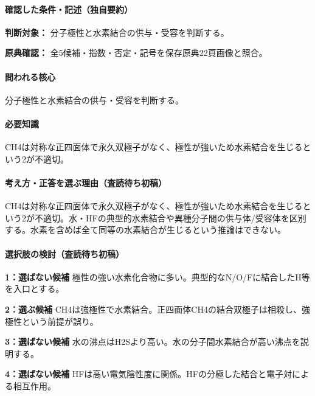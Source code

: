 \paragraph{確認した条件・記述（独自要約）}\mbox{}\par

\noindent\textbf{判断対象：} 分子極性と水素結合の供与・受容を判断する。\par

\noindent\textbf{原典確認：} 全5候補・指数・否定・記号を保存原典22頁画像と照合。\par

\paragraph{問われる核心} 分子極性と水素結合の供与・受容を判断する。

\paragraph{必要知識} CH4は対称な正四面体で永久双極子がなく、極性が強いため水素結合を生じるという2が不適切。

\paragraph{考え方・正答を選ぶ理由（査読待ち初稿）} CH4は対称な正四面体で永久双極子がなく、極性が強いため水素結合を生じるという2が不適切。水・HFの典型的水素結合や異種分子間の供与体/受容体を区別する。水素を含めば全て同等の水素結合が生じるという推論はできない。

\paragraph{選択肢の検討（査読待ち初稿）}\mbox{}\par

\noindent\textbf{1：選ばない候補} 極性の強い水素化合物に多い。典型的なN/O/Fに結合したH等を入口とする。\par

\noindent\textbf{2：選ぶ候補} CH4は強極性で水素結合。正四面体CH4の結合双極子は相殺し、強極性という前提が誤り。\par

\noindent\textbf{3：選ばない候補} 水の沸点はH2Sより高い。水の分子間水素結合が高い沸点を説明する。\par

\noindent\textbf{4：選ばない候補} HFは高い電気陰性度に関係。HFの分極した結合と電子対による相互作用。\par


